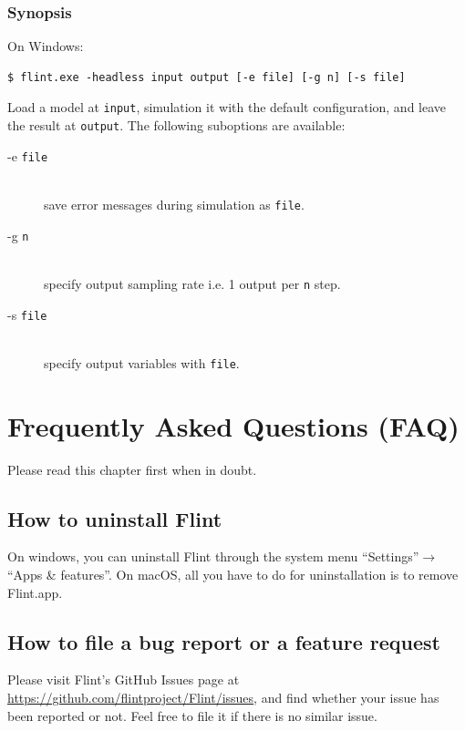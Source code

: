 \documentclass[a4paper,10pt]{report}
\begin{document}
\subsection{Synopsis}
On Windows:
\begin{verbatim}
$ flint.exe -headless input output [-e file] [-g n] [-s file]
\end{verbatim}
Load a model at {\tt input}, simulation it with the default configuration,
and leave the result at {\tt output}.
The following suboptions are available:
\begin{description}
\item[-e {\tt file}] \hfill \\
  save error messages during simulation as {\tt file}.
\item[-g {\tt n}] \hfill \\
  specify output sampling rate i.e. 1 output per {\tt n} step.
\item[-s {\tt file}] \hfill \\
  specify output variables with {\tt file}.
\end{description}


\chapter{Frequently Asked Questions (FAQ)}
Please read this chapter first when in doubt.

\section{How to uninstall Flint}
On windows, you can uninstall Flint through the system menu ``Settings''$\rightarrow$``Apps \& features''.
On macOS, all you have to do for uninstallation is to remove Flint.app.

\section{How to file a bug report or a feature request}
Please visit Flint's GitHub Issues page at
\url{https://github.com/flintproject/Flint/issues},
and find whether your issue has been reported or not.
Feel free to file it if there is no similar issue.




\end{document}
